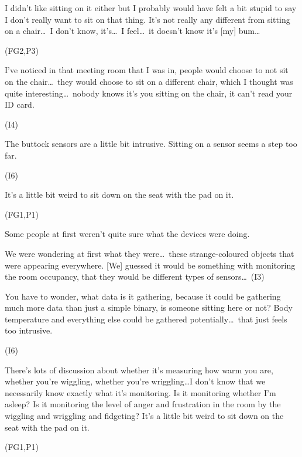 \begin{qt}I didn’t like sitting on it either but I probably would have felt a
bit stupid to say I don’t really want to sit on that thing. It’s not
really any different from sitting on a chair\ldots\  I don’t know,
it’s\ldots\  I feel\ldots\  it doesn’t know it’s [my] bum\ldots\end{qt} (FG2,P3)

\begin{qt}I’ve noticed in that meeting room that I was in, people would choose
to not sit on the chair\ldots\  they would choose to sit on a different
chair, which I thought was quite interesting\ldots\  nobody knows it’s you
sitting on the chair, it can’t read your ID card.\end{qt} (I4)

\begin{qt}The buttock sensors are a little bit intrusive. Sitting on a sensor seems a step too far.\end{qt} (I6)

\begin{qt}It’s a little bit weird to sit down on the seat with the pad on it.\end{qt} (FG1,P1)

Some people at first weren’t quite sure what the devices were doing.

\begin{qt}We were wondering at first what they were\ldots\  these strange-coloured
objects that were appearing everywhere. [We] guessed it would be
something with monitoring the room occupancy, that they would be
different types of sensors\ldots\  (I3)\end{qt}

\begin{qt}You have to wonder, what data is it gathering, because it could be gathering much more data than just a simple binary, is someone sitting here or not? Body temperature and everything else could be gathered potentially\ldots\  that just feels too intrusive.\end{qt} (I6)

\begin{qt}There’s lots of discussion about whether it’s measuring how warm you are, whether you’re wiggling, whether you’re wriggling…I don’t know that we necessarily know exactly what it’s monitoring. Is it monitoring whether I’m asleep? Is it monitoring the level of anger and frustration in the room by the wiggling and wriggling and fidgeting? It’s a little bit weird to sit down on the seat with the pad on it.\end{qt} (FG1,P1)

